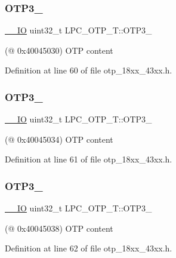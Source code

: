 \subsubsection{\texorpdfstring{O\+T\+P3\+\_}{OTP3\_0}}
{\footnotesize\ttfamily \hyperlink{core__sc300_8h_aec43007d9998a0a0e01faede4133d6be}{\+\_\+\+\_\+\+IO} uint32\+\_\+t L\+P\+C\+\_\+\+O\+T\+P\+\_\+\+T\+::\+O\+T\+P3\+\_}

(@ 0x40045030) O\+TP content 

Definition at line 60 of file otp\+\_\+18xx\+\_\+43xx.\+h.

\mbox{\label{struct_l_p_c___o_t_p___t_a00abd2bcfd9de419a961b64442f7433f}} 
\subsubsection{\texorpdfstring{O\+T\+P3\+\_}{OTP3\_1}}
{\footnotesize\ttfamily \hyperlink{core__sc300_8h_aec43007d9998a0a0e01faede4133d6be}{\+\_\+\+\_\+\+IO} uint32\+\_\+t L\+P\+C\+\_\+\+O\+T\+P\+\_\+\+T\+::\+O\+T\+P3\+\_}

(@ 0x40045034) O\+TP content 

Definition at line 61 of file otp\+\_\+18xx\+\_\+43xx.\+h.

\mbox{\label{struct_l_p_c___o_t_p___t_a2a7d5da3fbe0b23569747ca80e1f9063}} 
\subsubsection{\texorpdfstring{O\+T\+P3\+\_}{OTP3\_2}}
{\footnotesize\ttfamily \hyperlink{core__sc300_8h_aec43007d9998a0a0e01faede4133d6be}{\+\_\+\+\_\+\+IO} uint32\+\_\+t L\+P\+C\+\_\+\+O\+T\+P\+\_\+\+T\+::\+O\+T\+P3\+\_}

(@ 0x40045038) O\+TP content 

Definition at line 62 of file otp\+\_\+18xx\+\_\+43xx.\+h.

\mbox{\label{struct_l_p_c___o_t_p___t_a19718c242427f73aa346d3a5b10eddec}} 
